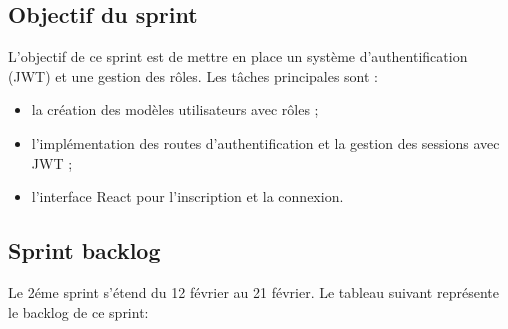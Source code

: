 \subsection{Objectif du sprint}
L'objectif de ce sprint est de mettre en place un système d'authentification (JWT) et une gestion des rôles. Les tâches principales sont :
\begin{itemize}
    \item la création des modèles utilisateurs avec rôles ;
    \item l'implémentation des routes d’authentification et la gestion des sessions avec JWT ;
    \item l’interface React pour l’inscription et la connexion.
\end{itemize}
\subsection{Sprint backlog}
Le 2éme sprint s’étend du 12 février au 21 février. Le tableau suivant représente le backlog de ce sprint: 


